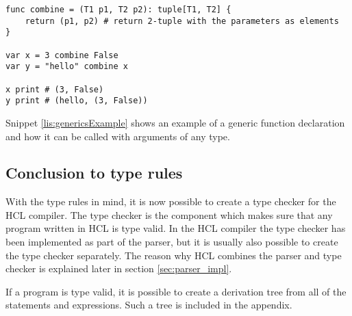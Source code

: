 \begin{lstlisting}[language=HCL,label=lis:genericsExample,caption=An example of a generic function declaration.]
func combine = (T1 p1, T2 p2): tuple[T1, T2] {
	return (p1, p2) # return 2-tuple with the parameters as elements
}

var x = 3 combine False
var y = "hello" combine x

x print # (3, False)
y print # (hello, (3, False))
\end{lstlisting}

Snippet \ref{lis:genericsExample} shows an example of a generic function declaration and how it can be called with arguments of any type.

\subsection{Conclusion to type rules}
With the type rules in mind, it is now possible to create a type checker for the HCL compiler.
The type checker is the component which makes sure that any program written in HCL is type valid.
In the HCL compiler the type checker has been implemented as part of the parser, but it is usually also possible to create the type checker separately.
The reason why HCL combines the parser and type checker is explained later in section \ref{sec:parser_impl}.

If a program is type valid, it is possible to create a derivation tree from all of the statements and expressions.
Such a tree is included in the appendix.

